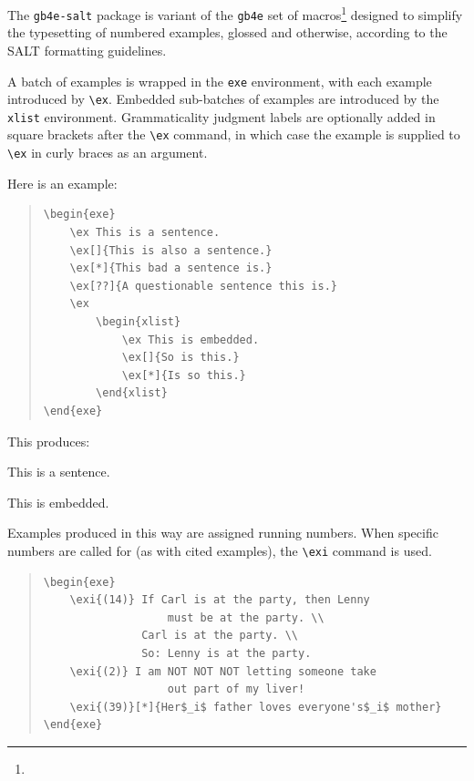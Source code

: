 \documentclass{salt}
\begin{document}
The \verb+gb4e-salt+ package is variant of the \verb+gb4e+ set of macros\footnote{} designed to simplify the typesetting of numbered examples, glossed and otherwise, according to the SALT formatting guidelines.

A batch of examples is wrapped in the \verb+exe+ environment, with each example introduced by \verb+\ex+. Embedded sub-batches of examples are introduced by the \verb+xlist+ environment. Grammaticality judgment labels are optionally added in square brackets after the \verb+\ex+ command, in which case the example is supplied to \verb+\ex+ in curly braces as an argument.

Here is an example:

\begin{quote}
\small
\begin{verbatim}
\begin{exe}
    \ex This is a sentence.
    \ex[]{This is also a sentence.}
    \ex[*]{This bad a sentence is.}
    \ex[??]{A questionable sentence this is.}
    \ex
        \begin{xlist}
            \ex This is embedded.
            \ex[]{So is this.}
            \ex[*]{Is so this.}
        \end{xlist}
\end{exe}
\end{verbatim}
\end{quote}

This produces:

\begin{exe}
    \ex This is a sentence.
    \label{exe:sent}
    \label{raw}
    \ex \label{exe:sents}
        \begin{xlist}
        
            \ex This is embedded.\label{embedded}
        \end{xlist}
\end{exe}

Examples produced in this way are assigned running numbers. When specific numbers are called for (as with cited examples), the \verb+\exi+ command is used.

\begin{quote}
\footnotesize
\begin{verbatim}
\begin{exe}
    \exi{(14)} If Carl is at the party, then Lenny
                   must be at the party. \\
               Carl is at the party. \\
               So: Lenny is at the party.
    \exi{(2)} I am NOT NOT NOT letting someone take 
                   out part of my liver!
    \exi{(39)}[*]{Her$_i$ father loves everyone's$_i$ mother}
\end{exe}
\end{verbatim}
\end{quote}
\end{document}
